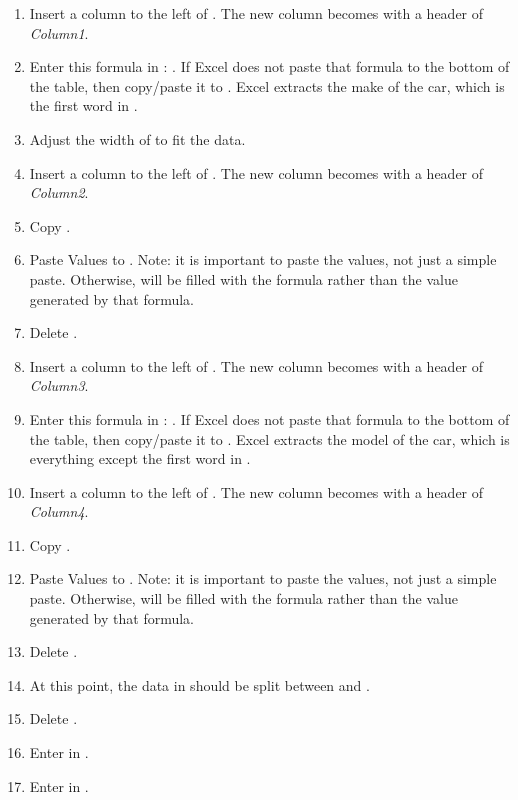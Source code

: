 \begin{enumbox}
\begin{enumerate}
		\begin{enumerate}
			\item Insert a column to the left of . The new column becomes  with a header of \textit{Column1}.
			\item Enter this formula in : . If Excel does not paste that formula to the bottom of the table, then copy/paste it to . Excel extracts the make of the car, which is the first word in .
			\item Adjust the width of  to fit the data.
			\item Insert a column to the left of . The new column becomes  with a header of \textit{Column2}.
			\item Copy .
			\item Paste Values to . Note: it is important to paste the values, not just a simple paste. Otherwise,  will be filled with the formula rather than the value generated by that formula.
			\item Delete .
	
			\item Insert a column to the left of . The new column becomes  with a header of \textit{Column3}.
			\item Enter this formula in : . If Excel does not paste that formula to the bottom of the table, then copy/paste it to . Excel extracts the model of the car, which is everything except the first word in .
			\item Insert a column to the left of . The new column becomes  with a header of \textit{Column4}.
			\item Copy .
			\item Paste Values to . Note: it is important to paste the values, not just a simple paste. Otherwise,  will be filled with the formula rather than the value generated by that formula.
			\item Delete .
			\item At this point, the data in  should be split between  and .
			\item Delete .
			\item Enter  in .
			\item Enter  in .
	

\end{enumerate}
\end{enumerate}
\end{enumbox}
